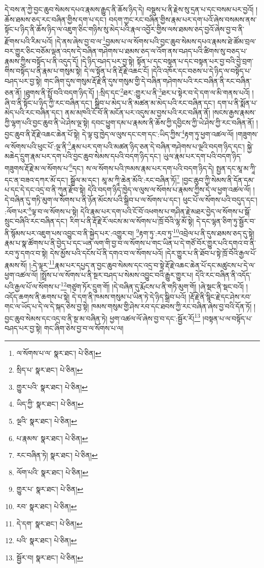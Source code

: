 དེ་བས་ན་ཀྱེ་བྱང་ཆུབ་སེམས་དཔའ་རྣམས་རྒྱུད་ནི་ཆོས་ཉིད་དེ། བསྡུས་པ་ནི་རྗེས་སུ་དྲན་པ་དང་བསམ་པར་བྱའོ། །ཆོས་ཐམས་ཅད་རང་བཞིན་གྱིས་དག་པ་དང་། བདག་ཀྱང་རང་བཞིན་གྱིས་རྣམ་པར་དག་པའོ་ཞེས་བསམས་ནས་སྟོང་པ་ཉིད་ནི་ཆོས་ཉིད་ལ་འཇུག་ཅིང་གཉིས་སུ་མེད་པའི་རྣལ་འབྱོར་གྱིས་ལས་ཐམས་ཅད་བྱའོ་ཞེས་བྱ་བ་ནི་རྫོགས་པའི་རིམ་པའོ། །དེ་ནས་ཞེས་བྱ་བ་ལ་\footnote{ལ་སོགས་པ་ལ་  སྣར་ཐང་།  པེ་ཅིན། }བྱམས་པ་ལ་སོགས་པའི་བྱང་ཆུབ་སེམས་དཔའ་རྣམས་ཐེ་ཚོམ་བྲལ་བར་གྱུར་ཅིང་བཅོམ་ལྡན་འདས་དེ་བཞིན་གཤེགས་པ་ཐམས་ཅད་ལ་འོག་ནས་བཤད་པའི་ཚིགས་སུ་བཅད་པ་རྣམས་ཀྱིས་བསྟོད་པ་ནི་འདུད་དོ། །དེ་ཉིད་བཤད་པར་བྱ་སྟེ། སྟོན་པ་དང་བསྟན་པ་དང་བསྟན་པར་བྱ་བའི་བྱེ་བྲག་གིས་བསྟོད་པ་ནི་རྣམ་པ་གསུམ་སྟེ། དེ་ལ་སྟོན་པ་ནི་རྡོ་རྗེ་འཆང་ངོ། །དེའི་འཁོར་དང་བཅས་པ་དེ་ཉིད་ལ་བསྟོད་པ་བཤད་པར་བྱ་སྟེ། གང་ཞིག་དུས་གསུམ་རྡོ་རྗེ་ནི་དུས་གསུམ་གྱི་དེ་བཞིན་གཤེགས་པའི་རང་བཞིན་ནི་རང་བཞིན་ཅན་ནོ། །ཐུགས་ནི་སྤྲོ་བའི་བདག་ཉིད་དོ། །:སྲིད་དང་\footnote{སྲིད་པ་  སྣར་ཐང་།  པེ་ཅིན། }ཐར་:གྱུར་པ་ནི་\footnote{གྱུར་པའི་  སྣར་ཐང་།  པེ་ཅིན། }ཐར་པ་སྟེར་བ་དེ་དག་ལ་མི་གནས་པའོ། །ཞི་བ་ནི་སྟོང་པ་ཉིད་ཀྱི་རང་བཞིན་དང་། སྒྲིབ་པ་མེད་པ་ནི་མཚན་མ་མེད་པའི་རང་བཞིན་དང་། དག་པ་ནི་སྨོན་པ་མེད་པའི་རང་བཞིན་དང་། ནམ་མཁའི་ངོ་བོ་ནི་མངོན་པར་འདུས་མ་བྱས་པའི་རང་བཞིན་ནོ། །སངས་རྒྱས་རྣམས་ཀྱི་ལྷག་པའི་བྱང་ཆུབ་ནི་ཡེ་ཤེས་ལྔ་སྟེ། དབང་ཕྱུག་དམ་པ་རྣམས་ནི་ཆོས་ཀྱི་དབྱིངས་ཀྱི་ཡེ་ཤེས་ཀྱི་རང་བཞིན་ནོ། །བྱང་ཆུབ་ནི་རྡོ་རྗེ་འཆང་ཆེན་པོ་སྟེ། དེ་ལྟ་བུ་ཁྱེད་ལ་ལུས་དང་ངག་དང་:ཡིད་ཀྱིས་\footnote{ཡིད་ཀྱི་  སྣར་ཐང་།  པེ་ཅིན། }རྟག་ཏུ་ཕྱག་འཚལ་ལོ། །གཟུགས་ལ་སོགས་པའི་ཕུང་པོ་:ལྔ་ནི་\footnote{ལྔའི་  སྣར་ཐང་།  པེ་ཅིན། }རྣམ་པར་དག་པའི་མཚན་ཉིད་ཅན་དེ་བཞིན་གཤེགས་པ་ལྔའི་བདག་ཉིད་དང་། སྐྱེ་མཆེད་དྲུག་རྣམ་པར་དག་པའི་བྱང་ཆུབ་སེམས་དཔའི་བདག་ཉིད་དང་། ཡུལ་རྣམ་པར་དག་པའི་བདག་ཉིད་གཟུགས་རྡོ་རྗེ་མ་ལ་སོགས་པ་\footnote{པ་རྣམས་  སྣར་ཐང་།  པེ་ཅིན། }དང་། ས་ལ་སོགས་པའི་ཁམས་རྣམ་པར་དག་པའི་བདག་ཉིད་དེ། སྤྱན་དང་མཱ་མ་ཀཱི་དང་ན་བཟའ་དཀར་མོ་དང་། སྒྲོལ་མ་དང་། མཱ་མ་ཀཱི་ཆེན་མོའི་:རང་བཞིན་ཏོ།\footnote{རང་བཞིན་ཏེ།  སྣར་ཐང་།  པེ་ཅིན། } །བྱང་ཆུབ་ཀྱི་སེམས་ནི་དོན་དམ་པ་དང་དེ་དང་འདྲ་བ་ནི་ཀུན་རྫོབ་སྟེ། དེའི་བདག་ཉིད་ཁྱེད་ལ་ལུས་ལ་སོགས་པ་རྣམས་ཀྱིས་དེ་ལ་ཕྱག་འཚལ་ལོ། །དེ་བཞིན་དུ་གཏི་མུག་ལ་སོགས་པ་ནི་ཉོན་མོངས་པའི་སྒྲིབ་པ་ལ་སོགས་པ་དང་། ཕུང་པོ་ལ་སོགས་པའི་བདུད་དང་། :ལོག་པར་\footnote{ལོག་པའི་  སྣར་ཐང་།  པེ་ཅིན། }ལྟ་བ་ལ་སོགས་པ་སྟེ། དེའི་རྣམ་པར་དག་པའི་ངོ་བོ་འཕགས་པ་གཤིན་རྗེ་མཐར་བྱེད་ལ་སོགས་པ་སྒོ་སྲུང་བཞིའི་རང་བཞིན་དང་། རིག་པ་ནི་རྡོ་རྗེ་རོ་ལངས་མ་ལ་སོགས་པ་ཁྲོ་བོའི་ལྷ་མོ་སྟེ། དེ་དང་ལྷན་ཅིག་ཏུ་སྦྱོར་བ་ནི་སྙོམས་པར་འཇུག་པས་འབྱུང་བ་ནི་སྐྱེད་པར་:འགྱུར་བ། \footnote{གྱུར་པ་  སྣར་ཐང་།  པེ་ཅིན། }རྟག་ཏུ་:རབ་ཏུ་\footnote{རབ་  སྣར་ཐང་།  པེ་ཅིན། }འབྲེལ་པ་ནི་དུས་ཐམས་ཅད་དུ་སྟེ། རྣམ་པ་སྣ་ཚོགས་པ་ནི་བྱེད་པ་དང་ཡན་ལག་གི་བྱ་བ་ལ་སོགས་པ་གང་ཡིན་པ་དེ་གཙོ་བོར་གྱུར་པའི་དགའ་བ་ནི་རབ་ཏུ་དགའ་བ་སྟེ། དེས་མྱོས་པའི་དངོས་པོ་ནི་དགའ་བ་ལ་སོགས་པའོ། །དེར་གྱུར་པ་ནི་ཐོབ་པ་སྟེ་ཁྲོ་བོའི་རྒྱལ་པོ་རྣམས་སོ། །:དེ་ལྟར་\footnote{དེ་དག་  སྣར་ཐང་།  པེ་ཅིན། }རྣམ་པར་དཔྱད་ན་བྱང་ཆུབ་སེམས་དང་འདྲ་བ་སྟེ་རྡོ་རྗེ་འཆང་ཆེན་པོ་དང་མཚུངས་པ་དེ་ལ་ཕྱག་འཚལ་ལོ། །སྤྲོས་པ་ལ་སོགས་པ་ནི་སྔར་བཤད་པ་སེམས་འབྱུང་བའི་རྒྱུར་གྱུར་པ། དེའི་རང་བཞིན་ནི་འདོད་པའི་རྒྱལ་པོ་ལ་སོགས་པ་\footnote{པའི་  སྣར་ཐང་།  པེ་ཅིན། }གཙུག་ཏོར་དྲུག་གོ། །དེ་བཞིན་དུ་རྨོངས་པ་ནི་གཏི་མུག་གོ། །ཞེ་སྡང་ནི་སྡང་བའོ། །འདོད་ཆགས་ནི་ཆགས་པ་སྟེ། དེ་དག་ནི་ཁམས་གསུམ་པ་ཡིན་ཏེ་དེ་ཉིད་སྒྲིབ་པའོ། །རྡོ་རྗེ་ནི་སྙིང་རྗེ་དང་ཤེས་རབ་གང་ལ་ཡོད་པ་དེ་ལ་དེ་སྐད་ཅེས་བྱ་སྟེ། ཁམས་གསུམ་གྱི་ཤེས་རབ་དང་ཐབས་ཀྱི་རང་བཞིན་ཞེས་བྱ་བའི་དོན་ཏོ། །བྱང་ཆུབ་སེམས་དང་འདྲ་བ་ནི་སྔ་མ་བཞིན་ཏེ། ཕྱག་འཚལ་ལོ་ཞེས་བྱ་བ་དང་:སྦྱོར་རོ།\footnote{སྦྱོར་བ།  སྣར་ཐང་།  པེ་ཅིན། } །བསྟན་པ་ལ་བསྟོད་པ་བཤད་པར་བྱ་སྟེ། གང་ཞིག་ཅེས་བྱ་བ་ལ་སོགས་པ་ལ། 